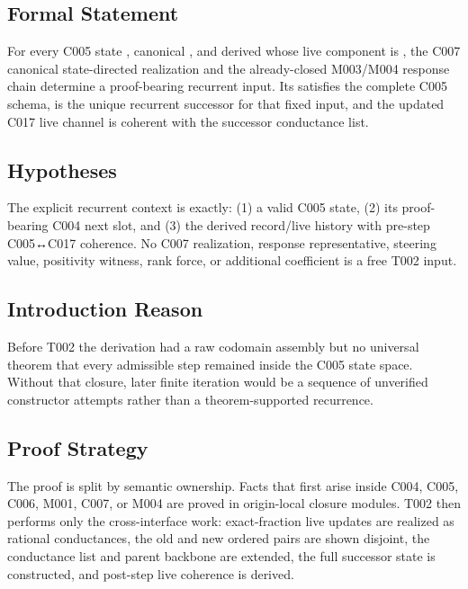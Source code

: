 \subsection{Formal Statement}\label{formal-statement-10}

For every C005 state \texttt{\protect{}}, canonical \texttt{\protect{}}, and
derived \texttt{\protect{}} whose live component is
\texttt{\protect{}}, the C007 canonical
state-directed realization and the already-closed M003/M004 response
chain determine a proof-bearing recurrent input. Its
\texttt{\protect{}} satisfies the complete C005 schema, is the
unique recurrent successor for that fixed input, and the updated C017
live channel is coherent with the successor conductance list.

\subsection{Hypotheses}\label{hypotheses-10}

The explicit recurrent context is exactly: (1) a valid C005 state, (2)
its proof-bearing C004 next slot, and (3) the derived record/live
history with pre-step C005↔C017 coherence. No C007 realization, response
representative, steering value, positivity witness, rank force, or
additional coefficient is a free T002 input.

\subsection{Introduction Reason}\label{introduction-reason-30}

Before T002 the derivation had a raw codomain assembly but no universal
theorem that every admissible step remained inside the C005 state space.
Without that closure, later finite iteration would be a sequence of
unverified constructor attempts rather than a theorem-supported
recurrence.

\subsection{Proof Strategy}\label{proof-strategy-10}

The proof is split by semantic ownership. Facts that first arise inside
C004, C005, C006, M001, C007, or M004 are proved in origin-local closure
modules. T002 then performs only the cross-interface work:
exact-fraction live updates are realized as rational conductances, the
old and new ordered pairs are shown disjoint, the conductance list and
parent backbone are extended, the full successor state is constructed,
and post-step live coherence is derived.

